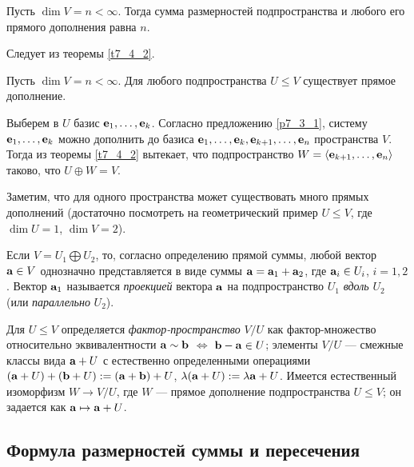 \begin{predl}\label{p7_4_4}
Пусть $\dim V = n< \infty$. Тогда сумма размерностей подпространства и любого его прямого
дополнения равна $n$.
\end{predl}
\dok
Следует из теоремы \ref{t7_4_2}.
\edok

\begin{predl}\label{p7_4_5}
Пусть $\dim V = n< \infty$. Для любого подпространства $U\leq V$ существует прямое дополнение.
\end{predl}
\dok
Выберем в $U$ базис $\mathbf{e}_1, \ldots, \mathbf{e}_k$. %
Согласно предложению  \ref{p7_3_1}, систему $\mathbf{e}_1, \ldots, \mathbf{e}_k$ можно дополнить до
базиса $\mathbf{e}_1, \ldots, \mathbf{e}_k, \mathbf{e}_{k+1}, \ldots ,\mathbf{e}_{n}$ пространства $V$.
Тогда из теоремы \ref{t7_4_2} вытекает, что  подпространство $W=\langle \mathbf{e}_{k+1}, \ldots, \mathbf{e}_n \rangle$ таково, что $U\oplus W = V$.
\edok

\otstup

Заметим, что для одного пространства может существовать много прямых дополнений
(достаточно посмотреть на геометрический пример $U\leq V$, где $\dim U=1$, $\dim V=2$). 

Если $V=U_1 \bigoplus U_2$, то, согласно определению прямой суммы, 
 любой вектор $\mathbf{a} \in V$ однозначно представляется в виде суммы
$\mathbf{a} = \mathbf{a}_1 + \mathbf{a}_2$, где $\mathbf{a}_i\in U_i$, $i=1, 2$.
 Вектор $\mathbf{a}_1$ называется 
{\it проекцией} вектора $\mathbf{a}$ на подпространство $U_1$ {\it вдоль} $U_2$ (или {\it параллельно} $U_2$).

\otstup

{\footnotesize
Для $U\leq V$ определяется {\it фактор-пространство} $V/U$ как
фактор-множество относительно эквивалентности $\mathbf{a}\sim \mathbf{b}$ $\Leftrightarrow$ $\mathbf{b}-\mathbf{a}\in U$;
элементы $V/U$ --- смежные классы вида $\mathbf{a} +U$ с естественно определенными операциями
$(\mathbf{a} +U)+(\mathbf{b} +U):=(\mathbf{a}+\mathbf{b} )+U$, $\lambda (\mathbf{a} +U) := \lambda \mathbf{a} +U$.
Имеется естественный изоморфизм $W\to V/U$,
где $W$ --- прямое дополнение подпространства $U\leq V$; он задается как $\mathbf{a} \mapsto \mathbf{a} +U$.
}

\subsection{Формула размерностей суммы и пересечения}


